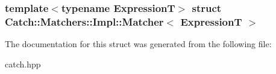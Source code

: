 \subsubsection*{template$<$typename ExpressionT$>$ struct Catch::Matchers::Impl::Matcher$<$ ExpressionT $>$}



The documentation for this struct was generated from the following file:\begin{DoxyCompactItemize}
\item 
catch.hpp\end{DoxyCompactItemize}
